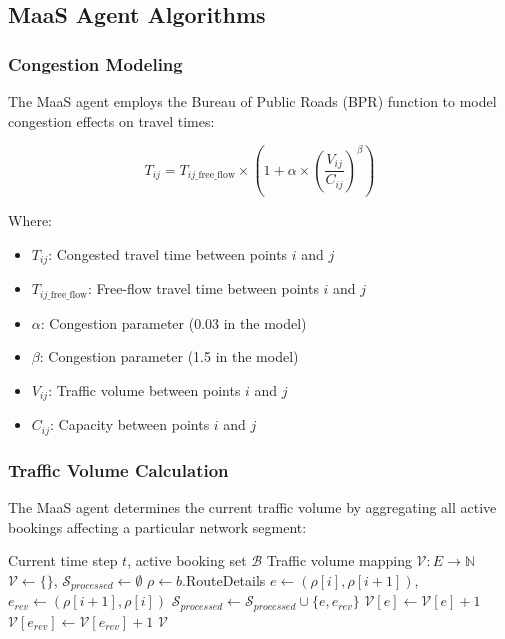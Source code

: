 \subsection{MaaS Agent Algorithms}
\subsubsection{Congestion Modeling}

The MaaS agent employs the Bureau of Public Roads (BPR) function to model congestion effects on travel times:

\begin{equation}
T_{ij} = T_{ij\_\text{free\_flow}} \times \left(1 + \alpha \times \left(\frac{V_{ij}}{C_{ij}}\right)^{\beta}\right)
\end{equation}

Where:
\begin{itemize}
    \item $T_{ij}$: Congested travel time between points $i$ and $j$
    \item $T_{ij\_\text{free\_flow}}$: Free-flow travel time between points $i$ and $j$
    \item $\alpha$: Congestion parameter (0.03 in the model)
    \item $\beta$: Congestion parameter (1.5 in the model)
    \item $V_{ij}$: Traffic volume between points $i$ and $j$
    \item $C_{ij}$: Capacity between points $i$ and $j$
\end{itemize}

\subsubsection{Traffic Volume Calculation}
The MaaS agent determines the current traffic volume by aggregating all active bookings affecting a particular network segment:

\begin{algorithm}
\caption{Dynamic Traffic Volume Aggregation}
\label{alg:traffic-aggregation}
\begin{algorithmic}[1]
\Require Current time step $t$, active booking set $\mathcal{B}$
\Ensure Traffic volume mapping $\mathcal{V}: E \rightarrow \mathbb{N}$
\State $\mathcal{V} \gets \{\}$, $\mathcal{S}_{processed} \gets \emptyset$
    \State $\rho \gets b$.RouteDetails
        \State $e \gets (\rho[i], \rho[i+1])$, $e_{rev} \gets (\rho[i+1], \rho[i])$
            \State $\mathcal{S}_{processed} \gets \mathcal{S}_{processed} \cup \{e, e_{rev}\}$
            \State $\mathcal{V}[e] \gets \mathcal{V}[e] + 1$
            \State $\mathcal{V}[e_{rev}] \gets \mathcal{V}[e_{rev}] + 1$
        \EndIf
    \EndFor
\EndFor
\State \Return $\mathcal{V}$
\end{algorithmic}
\end{algorithm}

